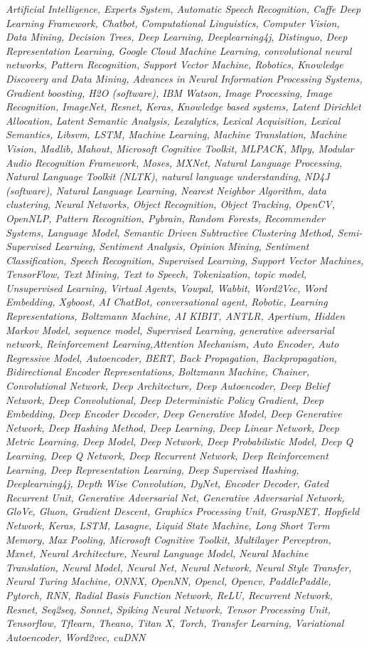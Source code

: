 \documentclass[conference]{IEEEtran}
\begin{document}
\begin{footnotesize}
\textit{Artificial Intelligence, Experts System, Automatic Speech Recognition, Caffe Deep Learning Framework, Chatbot, Computational Linguistics, Computer Vision, Data Mining, Decision Trees, Deep Learning, Deeplearning4j, Distinguo, Deep Representation Learning, Google Cloud Machine Learning, convolutional neural networks, Pattern Recognition, Support Vector Machine, Robotics, Knowledge Discovery and Data Mining, Advances in Neural Information Processing Systems, Gradient boosting, H2O (software), IBM Watson, Image Processing, Image Recognition, ImageNet, Resnet, Keras, Knowledge based systems, Latent Dirichlet Allocation, Latent Semantic Analysis, Lexalytics, Lexical Acquisition, Lexical Semantics, Libsvm, LSTM, Machine Learning, Machine Translation, Machine Vision, Madlib, Mahout, Microsoft Cognitive Toolkit, MLPACK, Mlpy, Modular Audio Recognition Framework, Moses, MXNet, Natural Language Processing, Natural Language Toolkit (NLTK), natural language understanding, ND4J (software), Natural Language Learning, Nearest Neighbor Algorithm, data clustering, Neural Networks, Object Recognition, Object Tracking, OpenCV, OpenNLP, Pattern Recognition, Pybrain, Random Forests, Recommender Systems, Language Model, Semantic Driven Subtractive Clustering Method, Semi-Supervised Learning, Sentiment Analysis, Opinion Mining, Sentiment Classification, Speech Recognition, Supervised Learning, Support Vector Machines, TensorFlow, Text Mining, Text to Speech, Tokenization, topic model, Unsupervised Learning, Virtual Agents, Vowpal, Wabbit, Word2Vec, Word Embedding, Xgboost, AI ChatBot, conversational agent, Robotic, Learning Representations, Boltzmann Machine, AI KIBIT, ANTLR, Apertium, Hidden Markov Model, sequence model, Supervised Learning, generative adversarial network, Reinforcement Learning,Attention Mechanism, Auto Encoder, Auto Regressive Model, Autoencoder, BERT, Back Propagation, Backpropagation, Bidirectional Encoder Representations, Boltzmann Machine, Chainer, Convolutional Network, Deep Architecture, Deep Autoencoder, Deep Belief Network, Deep Convolutional, Deep Deterministic Policy Gradient, Deep Embedding, Deep Encoder Decoder, Deep Generative Model, Deep Generative Network, Deep Hashing Method, Deep Learning, Deep Linear Network, Deep Metric Learning, Deep Model, Deep Network, Deep Probabilistic Model, Deep Q Learning, Deep Q Network, Deep Recurrent Network, Deep Reinforcement Learning, Deep Representation Learning, Deep Supervised Hashing, Deeplearning4j, Depth Wise Convolution, DyNet, Encoder Decoder,  Gated Recurrent Unit, Generative Adversarial Net, Generative Adversarial Network, GloVe, Gluon, Gradient Descent, Graphics Processing Unit, GraspNET, Hopfield Network, Keras, LSTM, Lasagne, Liquid State Machine, Long Short Term Memory, Max Pooling, Microsoft Cognitive Toolkit, Multilayer Perceptron, Mxnet, Neural Architecture, Neural Language Model, Neural Machine Translation, Neural Model, Neural Net, Neural Network, Neural Style Transfer, Neural Turing Machine, ONNX, OpenNN, Opencl, Opencv, PaddlePaddle, Pytorch, RNN, Radial Basis Function Network, ReLU, Recurrent Network, Resnet, Seq2seq, Sonnet, Spiking Neural Network, Tensor Processing Unit, Tensorflow, Tflearn, Theano, Titan X, Torch, Transfer Learning, Variational Autoencoder, Word2vec, cuDNN}

\end{footnotesize}
\end{document}
